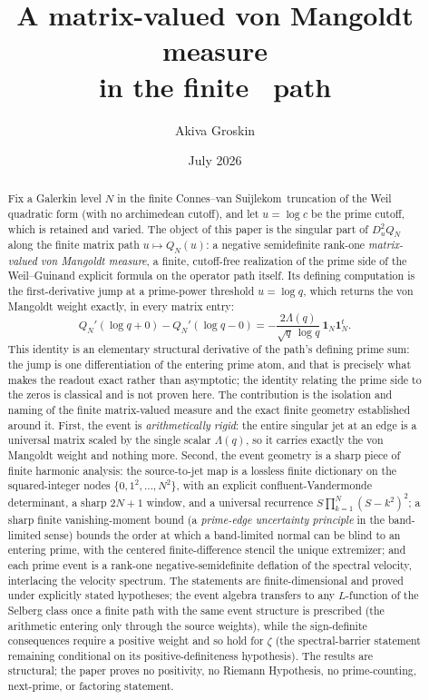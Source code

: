 \documentclass[11pt]{article}
\title{A matrix-valued von Mangoldt measure\\
in the finite \cvs\ path}
\author{Akiva Groskin}
\date{July 2026}
\theoremstyle{plain}
\theoremstyle{definition}
\theoremstyle{remark}
\newcommand{\cvs}{Connes--van Suijlekom}
\newcommand{\one}{\mathbf 1}
\newcommand{\Lam}{\Lambda}
\begin{document}
\maketitle

\begin{abstract}
Fix a Galerkin level $N$ in the finite \cvs\ truncation of the Weil
quadratic form (with no archimedean cutoff), and let $u=\log c$ be the prime
cutoff, which is retained and varied. The object of this paper is the singular
part of $D_u^2Q_N$ along the finite matrix path $u\mapsto Q_N(u)$: a negative
semidefinite rank-one \emph{matrix-valued von Mangoldt measure}, a finite,
cutoff-free realization of the prime side of the Weil--Guinand explicit
formula on the operator path itself. Its defining computation is the
first-derivative jump at a prime-power threshold $u=\log q$, which returns the
von Mangoldt weight exactly, in every matrix entry:
\[
        Q_N'(\log q+0)-Q_N'(\log q-0)
        =-\frac{2\Lam(q)}{\sqrt q\,\log q}\,\one_N\one_N^t .
\]
This identity is an elementary structural derivative of the path's defining
prime sum: the jump is one differentiation of the entering prime atom, and
that is precisely what makes the readout exact rather than asymptotic; the
identity relating the prime side to the zeros is classical and is not proven
here. The contribution is the isolation and naming of the finite matrix-valued
measure and the exact finite geometry established around it. First, the event
is \emph{arithmetically rigid}:
the entire singular jet at an edge is a universal matrix scaled by the single
scalar $\Lam(q)$, so it carries exactly the von Mangoldt weight and nothing
more. Second, the event geometry is a sharp piece of finite harmonic analysis: the
source-to-jet map is a lossless finite dictionary on the squared-integer nodes
$\{0,1^2,\dots,N^2\}$, with an explicit confluent-Vandermonde determinant, a
sharp $2N{+}1$ window, and a universal recurrence $S\prod_{k=1}^N(S-k^2)^2$; a
sharp finite vanishing-moment bound (a \emph{prime-edge uncertainty principle}
in the band-limited sense) bounds the order at which a
band-limited normal can be blind to an entering prime, with the centered
finite-difference stencil the unique extremizer; and each prime event is a
rank-one negative-semidefinite deflation of the spectral velocity, interlacing
the velocity spectrum. The statements are finite-dimensional and proved under
explicitly stated hypotheses; the event algebra transfers to any $L$-function of
the Selberg class once a finite path with the same event structure is prescribed
(the arithmetic entering only through the source weights), while the
sign-definite consequences require a positive weight and so hold for $\zeta$
(the spectral-barrier statement remaining conditional on its
positive-definiteness hypothesis). The results are structural; the paper
proves no positivity, no Riemann Hypothesis, no prime-counting, next-prime, or
factoring statement.
\end{abstract}
\end{document}
